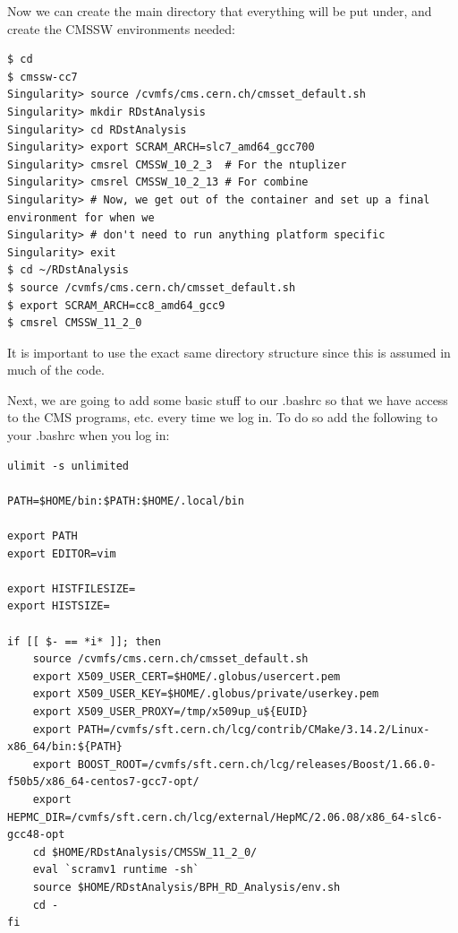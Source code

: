 \documentclass[12pt]{report}
\begin{document}
Now we can create the main directory that everything will be put under, and
create the CMSSW environments needed:
\begin{mdframed}[backgroundcolor=light-gray, roundcorner=10pt,leftmargin=1, rightmargin=1, innerleftmargin=15, innertopmargin=15,innerbottommargin=15, outerlinewidth=1, linecolor=light-gray,roundcorner=20pt]
\begin{lstlisting}
$ cd
$ cmssw-cc7
Singularity> source /cvmfs/cms.cern.ch/cmsset_default.sh
Singularity> mkdir RDstAnalysis
Singularity> cd RDstAnalysis
Singularity> export SCRAM_ARCH=slc7_amd64_gcc700
Singularity> cmsrel CMSSW_10_2_3  # For the ntuplizer
Singularity> cmsrel CMSSW_10_2_13 # For combine
Singularity> # Now, we get out of the container and set up a final environment for when we
Singularity> # don't need to run anything platform specific
Singularity> exit
$ cd ~/RDstAnalysis
$ source /cvmfs/cms.cern.ch/cmsset_default.sh
$ export SCRAM_ARCH=cc8_amd64_gcc9
$ cmsrel CMSSW_11_2_0
\end{lstlisting}
\end{mdframed}
It is important to use the exact same directory structure since this is assumed
in much of the code.

Next, we are going to add some basic stuff to our .bashrc so that we have
access to the CMS programs, etc. every time we log in. To do so add the
following to your .bashrc when you log in:

\begin{mdframed}[backgroundcolor=light-gray, roundcorner=10pt,leftmargin=1, rightmargin=1, innerleftmargin=15, innertopmargin=15,innerbottommargin=15, outerlinewidth=1, linecolor=light-gray,roundcorner=20pt]
\begin{lstlisting}
ulimit -s unlimited

PATH=$HOME/bin:$PATH:$HOME/.local/bin

export PATH
export EDITOR=vim

export HISTFILESIZE=
export HISTSIZE=

if [[ $- == *i* ]]; then
    source /cvmfs/cms.cern.ch/cmsset_default.sh
    export X509_USER_CERT=$HOME/.globus/usercert.pem
    export X509_USER_KEY=$HOME/.globus/private/userkey.pem
    export X509_USER_PROXY=/tmp/x509up_u${EUID}
    export PATH=/cvmfs/sft.cern.ch/lcg/contrib/CMake/3.14.2/Linux-x86_64/bin:${PATH}
    export BOOST_ROOT=/cvmfs/sft.cern.ch/lcg/releases/Boost/1.66.0-f50b5/x86_64-centos7-gcc7-opt/
    export HEPMC_DIR=/cvmfs/sft.cern.ch/lcg/external/HepMC/2.06.08/x86_64-slc6-gcc48-opt
    cd $HOME/RDstAnalysis/CMSSW_11_2_0/
    eval `scramv1 runtime -sh`
    source $HOME/RDstAnalysis/BPH_RD_Analysis/env.sh
    cd -
fi

\end{lstlisting}
\end{mdframed}
\end{document}
